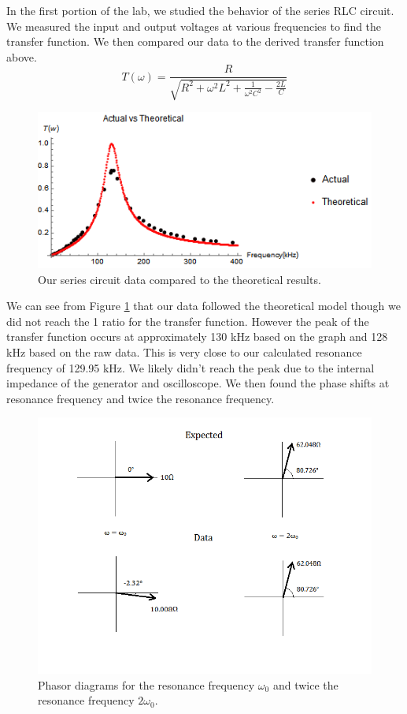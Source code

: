 \documentclass[11pt,letterpaper,onecolumn]{article}
\begin{document}
In the first portion of the lab, we studied the behavior of the series RLC circuit. We measured the input and output voltages at various frequencies to find the transfer function. We then compared our data to the derived transfer function above.
$$T(\omega) = \frac{R}{\sqrt{R^2 + \omega^2L^2 + \frac{1}{\omega^2C^2}-\frac{2L}{C}}}$$

\begin{figure}[H]
    \centering
    \includegraphics[scale = 0.8]{Series.png}
    \caption{Our series circuit data compared to the theoretical results.}
    \label{fig:sermodel}
\end{figure}

We can see from Figure \ref{fig:sermodel} that our data followed the theoretical model though we did not reach the 1 ratio for the transfer function. However the peak of the transfer function occurs at approximately 130 kHz based on the graph and 128 kHz based on the raw data. This is very close to our calculated resonance frequency of 129.95 kHz. We likely didn't reach the peak due to the internal impedance of the generator and oscilloscope.
We then found the phase shifts at resonance frequency and twice the resonance frequency.

\begin{figure}[H]
    \centering
    \includegraphics[scale = 0.8]{Phasor.png}
    \caption{Phasor diagrams for the resonance frequency $\omega_0$ and twice the resonance frequency $2\omega_0$.}
    \label{fig:phasor}
\end{figure}
\end{document}
